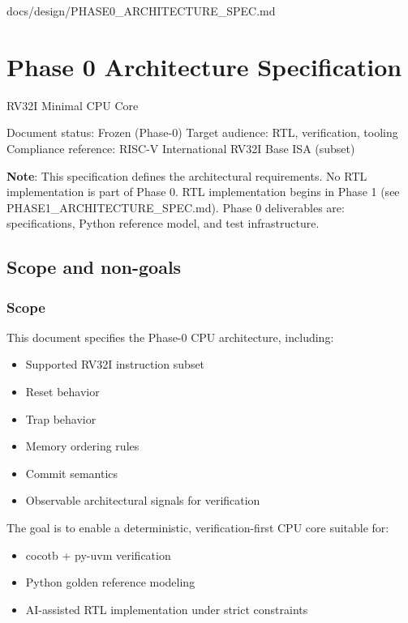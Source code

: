 \begin{relocated}{docs/design/PHASE0_ARCHITECTURE_SPEC.md}
\section{Phase 0 Architecture Specification}\label{ds:ch:phase0-architecture}

RV32I Minimal CPU Core

Document status: Frozen (Phase-0) Target audience: RTL, verification,
tooling Compliance reference: RISC-V International RV32I Base ISA
(subset)

\textbf{Note}: This specification defines the architectural
requirements. No RTL implementation is part of Phase 0. RTL
implementation begins in Phase 1 (see
PHASE1\_\allowbreak{}ARCHITECTURE\_\allowbreak{}SPEC.md). Phase 0
deliverables are: specifications, Python reference model, and test
infrastructure.

\subsection{Scope and non-goals}\label{ds:ch:phase0-architecture:scope-and-non-goals}

\subsubsection{Scope}\label{ds:ch:phase0-architecture:scope}

This document specifies the Phase-0 CPU architecture, including:

\begin{itemize}
\tightlist
\item
  Supported RV32I instruction subset
\item
  Reset behavior
\item
  Trap behavior
\item
  Memory ordering rules
\item
  Commit semantics
\item
  Observable architectural signals for verification
\end{itemize}

The goal is to enable a deterministic, verification-first CPU core
suitable for:

\begin{itemize}
\tightlist
\item
  cocotb + py-uvm verification
\item
  Python golden reference modeling
\item
  AI-assisted RTL implementation under strict constraints
\end{itemize}


\end{relocated}
